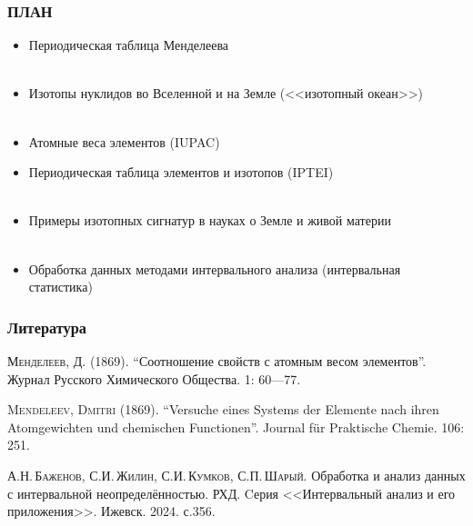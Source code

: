 \documentclass{beamer}
\begin{document}
\begin{frame}
	\frametitle{ПЛАН}
\begin{itemize}
	\item Периодическая таблица Менделеева\\
	~\\
	\item Изотопы нуклидов во Вселенной и на Земле (<<изотопный океан>>)\\
	~\\
	\item Атомные веса элементов (IUPAC)
	\item Периодическая таблица элементов и изотопов (IPTEI)\\
	~\\
	\item Примеры изотопных сигнатур в науках о Земле и живой материи\\
	~\\
	\item Обработка данных методами интервального анализа (интервальная статистика)
\end{itemize}
\end{frame}


















\begin{frame}
\frametitle{Литература}
\begin{thebibliography}{9}

\textsc{Менделеев, Д.} (1869). “Соотношение свойств с атомным весом элементов”. Журнал Русского Химического Общества. 1: 60—77.

\textsc{Mendeleev, Dmitri} (1869). “Versuche eines Systems der Elemente nach ihren Atomgewichten und chemischen Functionen”. Journal für Praktische Chemie. 106: 251.

 \textsc{А.Н.\,Баженов, С.И.\,Жилин, С.И.\,Кумков, С.П.\,Шарый.} Обработка и анализ данных с интервальной неопределённостью. РХД. Cерия <<Интервальный анализ и его приложения>>. Ижевск. 2024. с.356.	




\end{thebibliography}	
\end{frame}
\end{document}
